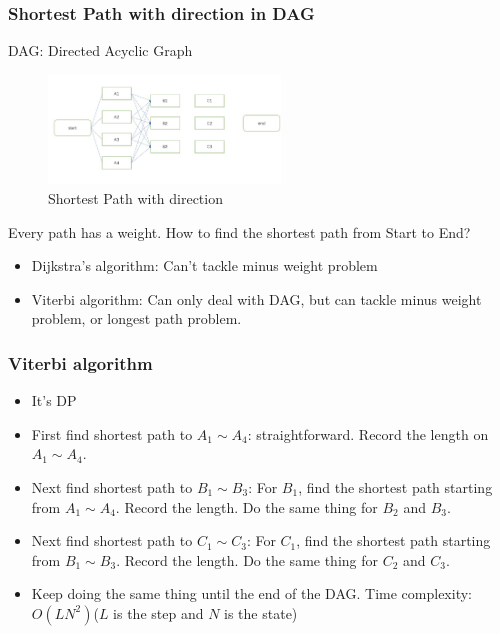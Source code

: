 \documentclass{beamer}
\begin{document}
\begin{frame}
    \frametitle{Shortest Path with direction in DAG}
    DAG: Directed Acyclic Graph
    \begin{figure}[H]
        \centering
        \includegraphics[width=0.55\textwidth,height=0.2\textwidth]{graph1.jpg}
        \caption{Shortest Path with direction}
    \end{figure}\par
    Every path has a weight. How to find the shortest path from Start to End?
    \begin{itemize}
        \item Dijkstra's algorithm: Can't tackle minus weight problem
        \item Viterbi algorithm: Can only deal with DAG, but can tackle minus weight problem, or longest path problem.
    \end{itemize}
    
\end{frame}

\begin{frame}
    \frametitle{Viterbi algorithm}
    \begin{itemize}
        \item It's DP
        \item First find shortest path to $A_1\sim A_4$: straightforward. Record the length on $A_1\sim A_4$.
        \item Next find shortest path to $B_1\sim B_3$: For $B_1$, find the shortest path starting from $A_1\sim A_4$. Record the length. Do the same thing for $B_2$ and $B_3$.
        \item Next find shortest path to $C_1\sim C_3$: For $C_1$, find the shortest path starting from $B_1\sim B_3$. Record the length. Do the same thing for $C_2$ and $C_3$.
        \item Keep doing the same thing until the end of the DAG. Time complexity: $O(LN^2)$($L$ is the step and $N$ is the state)
    \end{itemize}
    

\end{frame}
\end{document}
